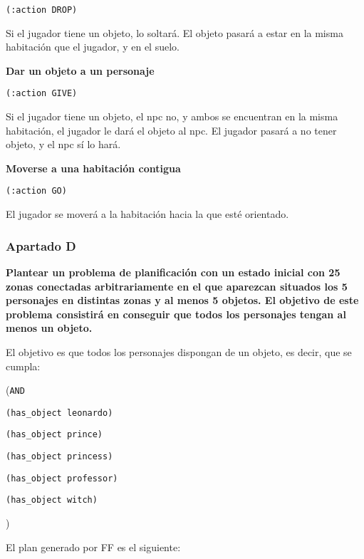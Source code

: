 \documentclass[11pt,a4paper]{article}
\begin{document}
\texttt{(:action DROP)}

\smallskip

Si el jugador tiene un objeto, lo soltará. El objeto pasará a estar en la misma habitación que el jugador,
y en el suelo.

\medskip

\large{\textbf{Dar un objeto a un personaje}}

\texttt{(:action GIVE)}

\smallskip

Si el jugador tiene un objeto, el npc no, y ambos se encuentran en la misma habitación, el jugador le dará 
el objeto al npc. El jugador pasará a no tener objeto, y el npc sí lo hará. 

\medskip
\large{\textbf{Moverse a una habitación contigua}}

\texttt{(:action GO)}

\smallskip

El jugador se moverá a la habitación hacia la que esté orientado.

\medskip

\subsubsection{Apartado D}

\textbf{Plantear un problema de planificación con un estado inicial con 25 zonas conectadas arbitrariamente en el que aparezcan situados los 5  personajes en distintas zonas y al menos 5 objetos. El objetivo de este problema consistirá en conseguir que todos los personajes  tengan al menos un objeto.}

\medskip

El objetivo es que todos los personajes dispongan de un objeto, es decir, que se cumpla:

\medskip

(\texttt{AND}

\quad \texttt{(has\_object leonardo)}

\quad \texttt{(has\_object prince)}

\quad \texttt{(has\_object princess)}

\quad \texttt{(has\_object professor)}

\quad \texttt{(has\_object witch)}

)

\bigskip

El plan generado por FF es el siguiente:
\end{document}

